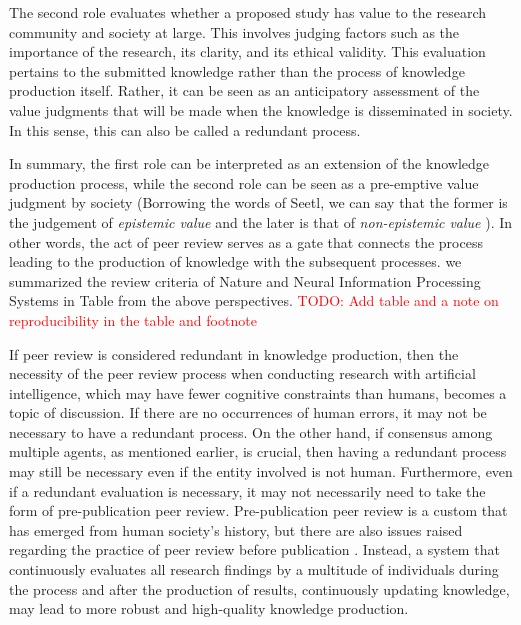 \documentclass{book}
\begin{document}
The second role evaluates whether a proposed study has value to the research community and society at large. This involves judging factors such as the importance of the research, its clarity, and its ethical validity. This evaluation pertains to the submitted knowledge rather than the process of knowledge production itself. Rather, it can be seen as an anticipatory assessment of the value judgments that will be made when the knowledge is disseminated in society. In this sense, this can also be called a redundant process.

In summary, the first role can be interpreted as an extension of the knowledge production process, while the second role can be seen as a pre-emptive value judgment by society (Borrowing the words of Seetl, we can say that the former is the judgement of \textit{epistemic value} and the later is that of \textit{non-epistemic value} \cite{steel2010epistemic}). In other words, the act of peer review serves as a gate that connects the process leading to the production of knowledge with the subsequent processes. we summarized the review criteria of Nature and Neural Information Processing Systems in Table from the above perspectives. \textcolor{red}{TODO: Add table and a note on reproducibility in the table and footnote}

If peer review is considered redundant in knowledge production, then the necessity of the peer review process when conducting research with artificial intelligence, which may have fewer cognitive constraints than humans, becomes a topic of discussion. If there are no occurrences of human errors, it may not be necessary to have a redundant process. On the other hand, if consensus among multiple agents, as mentioned earlier, is crucial, then having a redundant process may still be necessary even if the entity involved is not human. Furthermore, even if a redundant evaluation is necessary, it may not necessarily need to take the form of pre-publication peer review. Pre-publication peer review is a custom that has emerged from human society's history, but there are also issues raised regarding the practice of peer review before publication \cite{heesen2021peer}. Instead, a system that continuously evaluates all research findings by a multitude of individuals during the process and after the production of results, continuously updating knowledge, may lead to more robust and high-quality knowledge production.

\end{document}
